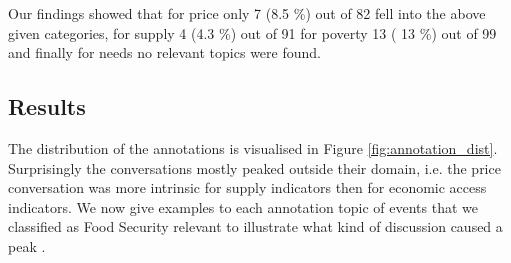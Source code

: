 Our findings showed that for price only 7 (8.5 \%) out of 82 fell into the above given categories, for  supply 4 (4.3 \%) out of 91 for poverty 13 ( 13 \%) out of 99 and finally for needs no relevant topics were found. 


\subsection{Results}

The distribution of the annotations is visualised in Figure \ref{fig:annotation_dist}. Surprisingly the conversations mostly peaked outside their domain, i.e. the price conversation was more intrinsic for supply indicators then for economic access indicators. We now give examples to each annotation topic of events that we classified as Food Security relevant to illustrate what kind of discussion caused a peak . 



